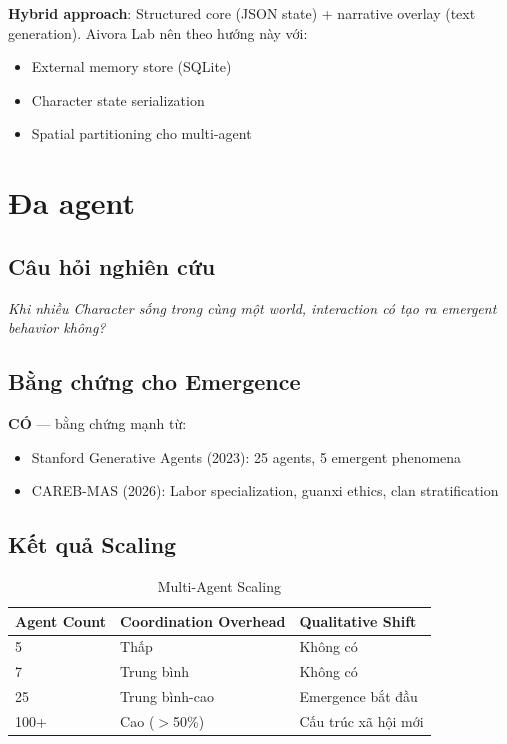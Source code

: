 \documentclass[10pt,leqno]{amsart}
\begin{document}
\textbf{Hybrid approach}: Structured core (JSON state) + narrative overlay (text generation). Aivora Lab nên theo hướng này với:
\begin{itemize}
    \item External memory store (SQLite)
    \item Character state serialization
    \item Spatial partitioning cho multi-agent
\end{itemize}


\section{Đa agent}

\subsection{Câu hỏi nghiên cứu}

\textit{Khi nhiều Character sống trong cùng một world, interaction có tạo ra emergent behavior không?}

\subsection{Bằng chứng cho Emergence}

\textbf{CÓ} --- bằng chứng mạnh từ:
\begin{itemize}
    \item Stanford Generative Agents (2023): 25 agents, 5 emergent phenomena
    \item CAREB-MAS (2026): Labor specialization, guanxi ethics, clan stratification
\end{itemize}

\subsection{Kết quả Scaling}

\begin{table}[H]
\centering
\caption{Multi-Agent Scaling}
\label{tab:multi-agent-scale}
\begin{tabular}{lll}
\toprule
\textbf{Agent Count} & \textbf{Coordination Overhead} & \textbf{Qualitative Shift} \\
\midrule
5 & Thấp & Không có \\
7 & Trung bình & Không có \\
25 & Trung bình-cao & Emergence bắt đầu \\
100+ & Cao ($>$50\%) & Cấu trúc xã hội mới \\
\bottomrule
\end{tabular}
\end{table}
\end{document}

